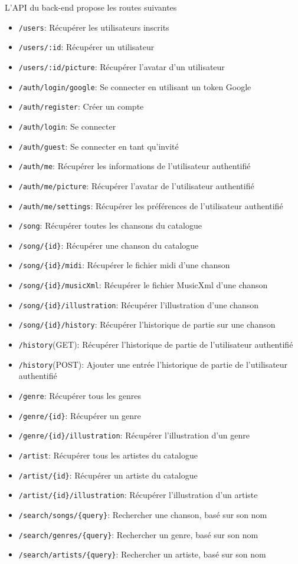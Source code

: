 L'API du back-end propose les routes suivantes

\begin{itemize}
	\item \verb|/users|: Récupérer les utilisateurs inscrits
	\item \verb|/users/:id|: Récupérer un utilisateur
	\item \verb|/users/:id/picture|: Récupérer l'avatar d'un utilisateur
	\item \verb|/auth/login/google|: Se connecter en utilisant un token Google
	\item \verb|/auth/register|: Créer un compte
	\item \verb|/auth/login|: Se connecter
	\item \verb|/auth/guest|: Se connecter en tant qu'invité
	\item \verb|/auth/me|: Récupérer les informations de l'utilisateur authentifié
	\item \verb|/auth/me/picture|: Récupérer l'avatar de l'utilisateur authentifié
	\item \verb|/auth/me/settings|: Récupérer les préférences de l'utilisateur authentifié
	\item \verb|/song|: Récupérer toutes les chansons du catalogue
	\item \verb|/song/{id}|: Récupérer une chanson du catalogue
	\item \verb|/song/{id}/midi|: Récupérer le fichier midi d'une chanson
	\item \verb|/song/{id}/musicXml|: Récupérer le fichier MusicXml d'une chanson
	\item \verb|/song/{id}/illustration|: Récupérer l'illustration d'une chanson
	\item \verb|/song/{id}/history|: Récupérer l'historique de partie sur une chanson
	\item \verb|/history|(GET): Récupérer l'historique de partie de l'utilisateur authentifié
	\item \verb|/history|(POST): Ajouter une entrée l'historique de partie de l'utilisateur authentifié
	\item \verb|/genre|: Récupérer tous les genres
	\item \verb|/genre/{id}|: Récupérer un genre
	\item \verb|/genre/{id}/illustration|: Récupérer l'illustration d'un genre
	\item \verb|/artist|: Récupérer tous les artistes du catalogue
	\item \verb|/artist/{id}|: Récupérer un artiste du catalogue
	\item \verb|/artist/{id}/illustration|: Récupérer l'illustration d'un artiste
	\item \verb|/search/songs/{query}|: Rechercher une chanson, basé sur son nom
	\item \verb|/search/genres/{query}|: Rechercher un genre, basé sur son nom
	\item \verb|/search/artists/{query}|: Rechercher un artiste, basé sur son nom
\end{itemize}

